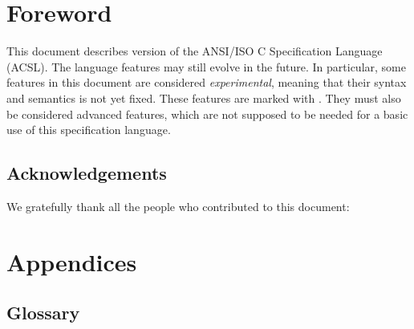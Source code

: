 \documentclass[web]{frama-c-book}
\newcommand{\version}{}
\begin{document}
\cleardoublepage
{}
\label{chap:contents}
\tableofcontents

\chapter*{Foreword}


This document describes version \version{} of the ANSI/ISO C Specification Language (ACSL). 
The language features may still evolve in the future. 
In particular, some features in this document
are considered \emph{experimental}, meaning that their syntax and
semantics is not yet fixed.  
These features are marked with
\experimental.  
They must also be considered advanced features,
which are not supposed to be needed for a basic use of this
specification language.

\section*{Acknowledgements}

We gratefully thank all the people who contributed to this document:












\appendix

\chapter{Appendices}
\label{chap:appendix}



\section{Glossary}
\label{sec:glossary}
\end{document}
